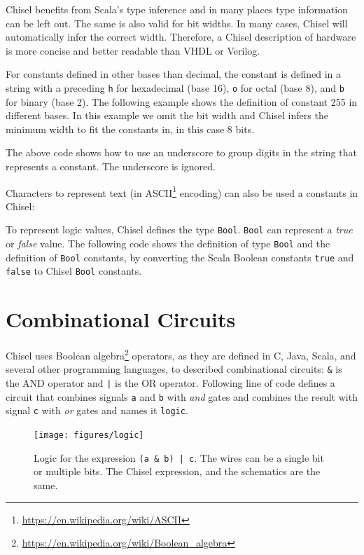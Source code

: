 \documentclass[%
    10pt,
    headinclude, footexclude,
    openright, %
    notitlepage,
    cleardoubleempty,
    headsepline,
    pointlessnumbers,
    bibtotoc, idxtotoc,
    ]{scrbook}
\newcommand{\code}[1]{{\small{\texttt{#1}}}}
\newcommand{\myref}[2]{\href{#1}{#2}}
\renewcommand{\myref}[2]{{#2}{\footnote{\url{#1}}}}
\begin{document}
Chisel benefits from Scala's type inference and in many places type information can be left out.
The same is also valid for bit widths. In many cases, Chisel will automatically infer the correct width.
Therefore, a Chisel description of hardware is more concise and better readable than VHDL or
Verilog.

For constants defined in other bases than decimal, the constant is defined in a string with
a preceding \code{h} for hexadecimal (base 16), \code{o} for octal (base 8), and \code{b}
for binary (base 2). The following example shows the definition of constant 255 in different
bases. In this example we omit the bit width and Chisel infers the minimum width to fit
the constants in, in this case 8 bits.


\noindent The above code shows how to use an underscore to group digits in the
string that represents a constant. The underscore is ignored.

Characters to represent text (in \myref{https://en.wikipedia.org/wiki/ASCII}{ASCII} encoding)
can also be used a constants in Chisel:



To represent logic values, Chisel defines the type \code{Bool}.
\code{Bool} can represent a \emph{true} or \emph{false} value.
The following code shows the definition of type \code{Bool} and the definition of
\code{Bool} constants, by converting the Scala Boolean constants \code{true}
and \code{false} to Chisel \code{Bool} constants.



\section{Combinational Circuits}

Chisel uses \myref{https://en.wikipedia.org/wiki/Boolean_algebra}{Boolean algebra} operators,
as they are defined in C, Java, Scala, and several other programming languages,
to described combinational circuits: \code{\&} is the AND operator and \code{|} is
the OR operator.
Following line of code defines a circuit that combines signals \code{a} and \code{b} with \emph{and}
gates and combines the result with signal \code{c} with \emph{or} gates and names it \code{logic}.


\begin{figure}
  \centering
  \texttt{[image: figures/logic]}
  \caption{Logic for the expression \code{(a \& b) | c}.
  The wires can be a single bit or multiple bits. The Chisel expression, and the schematics are the same.}
  \label{fig:logic}
\end{figure}
\end{document}
